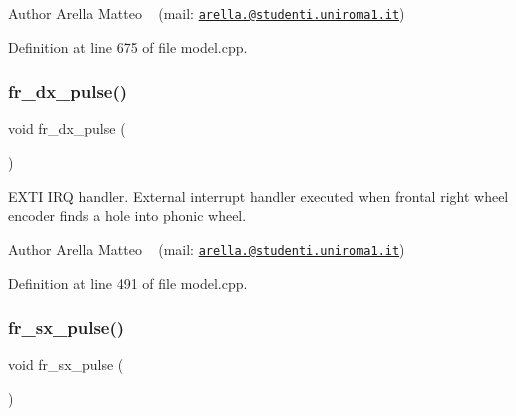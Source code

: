 \begin{DoxyAuthor}{Author}
Arella Matteo ~\newline
 (mail\+: \href{mailto:arella.1646983@studenti.uniroma1.it}{\tt arella.@studenti.\+uniroma1.\+it}) 
\end{DoxyAuthor}


Definition at line 675 of file model.\+cpp.

\mbox{\label{group___board__model__group_ga809e754563f2877e3264fd49483ceac9}} 
\subsubsection{\texorpdfstring{fr\+\_\+dx\+\_\+pulse()}{fr\_dx\_pulse()}}
{\footnotesize\ttfamily void fr\+\_\+dx\+\_\+pulse (\begin{DoxyParamCaption}{ }\end{DoxyParamCaption})}



E\+X\+TI I\+RQ handler. External interrupt handler executed when frontal right wheel encoder finds a hole into phonic wheel. 

\begin{DoxyAuthor}{Author}
Arella Matteo ~\newline
 (mail\+: \href{mailto:arella.1646983@studenti.uniroma1.it}{\tt arella.@studenti.\+uniroma1.\+it}) 
\end{DoxyAuthor}


Definition at line 491 of file model.\+cpp.

\mbox{\label{group___board__model__group_ga40f87aeb451c092cf21baf57defc516e}} 
\subsubsection{\texorpdfstring{fr\+\_\+sx\+\_\+pulse()}{fr\_sx\_pulse()}}
{\footnotesize\ttfamily void fr\+\_\+sx\+\_\+pulse (\begin{DoxyParamCaption}{ }\end{DoxyParamCaption})}



